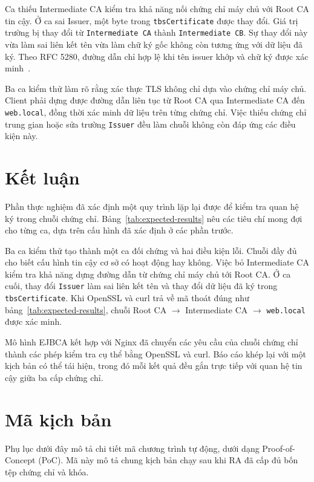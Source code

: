 \documentclass[11pt,a4paper]{article}
\begin{document}
Ca thiếu Intermediate CA kiểm tra khả năng nối chứng chỉ máy chủ với
Root CA tin cậy. Ở ca sai Issuer, một byte trong
\texttt{tbsCertificate} được thay đổi. Giá trị trường bị thay đổi từ
\texttt{Intermediate CA} thành \texttt{Intermediate CB}.
Sự thay đổi này vừa làm sai liên kết tên vừa làm chữ ký gốc không còn
tương ứng với dữ liệu đã ký. Theo RFC 5280, đường dẫn chỉ hợp lệ khi
tên issuer khớp và chữ ký được xác minh~\cite{RFC5280}.

Ba ca kiểm thử làm rõ rằng xác thực TLS không chỉ dựa vào chứng chỉ
máy chủ. Client phải dựng được đường dẫn liên tục từ Root CA qua
Intermediate CA đến \texttt{web.local}, đồng thời xác minh dữ liệu trên
từng chứng chỉ. Việc thiếu chứng chỉ trung gian hoặc sửa trường
\texttt{Issuer} đều làm chuỗi không còn đáp ứng các điều kiện này.

\section{Kết luận}

Phần thực nghiệm đã xác định một quy trình lặp lại được để kiểm tra quan
hệ ký trong chuỗi chứng chỉ. Bảng~\ref{tab:expected-results} nêu các
tiêu chí mong đợi cho từng ca, dựa trên cấu hình đã xác định ở các phần
trước.

Ba ca kiểm thử tạo thành một ca đối chứng và hai điều kiện lỗi.
Chuỗi đầy đủ cho biết cấu hình tin cậy cơ sở có hoạt động hay
không.
Việc bỏ Intermediate CA kiểm tra khả năng dựng đường dẫn từ
chứng chỉ máy chủ tới Root CA.
Ở ca cuối, thay đổi \texttt{Issuer} làm sai liên kết tên và thay
đổi dữ liệu đã ký trong \texttt{tbsCertificate}.
Khi OpenSSL và curl trả về mã thoát đúng như
bảng~\ref{tab:expected-results}, chuỗi Root CA $\rightarrow$
Intermediate CA $\rightarrow$ \texttt{web.local} được xác minh.

Mô hình EJBCA kết hợp với Nginx đã chuyển các yêu cầu của chuỗi chứng
chỉ thành các phép kiểm tra cụ thể bằng OpenSSL và curl. Báo cáo khép
lại với một kịch bản có thể tái hiện, trong đó mỗi kết quả đều gắn trực
tiếp với quan hệ tin cậy giữa ba cấp chứng chỉ.

\printbibliography[heading=bibintoc,title={Tài liệu tham khảo}]

\clearpage
\appendix
\section{Mã kịch bản}

Phụ lục dưới đây mô tả chi tiết mã chương trình tự động, dưới dạng Proof-of-Concept (PoC).
Mã này mô tả chung kịch bản chạy sau khi RA đã cấp đủ bốn tệp chứng chỉ và khóa.
\end{document}
